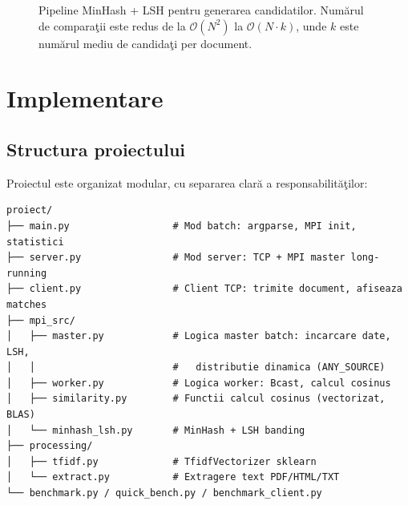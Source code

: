 \documentclass[a4paper,12pt]{report}
\begin{document}
\begin{figure}[H]
\centering
{}
\caption{Pipeline MinHash + LSH pentru generarea candidatilor. Num\u{a}rul de compara\c{t}ii este redus de la $\mathcal{O}(N^2)$ la $\mathcal{O}(N \cdot k)$, unde $k$ este num\u{a}rul mediu de candida\c{t}i per document.}
\label{fig:lsh_pipeline}
\end{figure}

\chapter{Implementare}

\section{Structura proiectului}

Proiectul este organizat modular, cu separarea clar\u{a} a responsabilit\u{a}\c{t}ilor:

\begin{verbatim}
proiect/
├── main.py                  # Mod batch: argparse, MPI init, statistici
├── server.py                # Mod server: TCP + MPI master long-running
├── client.py                # Client TCP: trimite document, afiseaza matches
├── mpi_src/
│   ├── master.py            # Logica master batch: incarcare date, LSH,
│   │                        #   distributie dinamica (ANY_SOURCE)
│   ├── worker.py            # Logica worker: Bcast, calcul cosinus
│   ├── similarity.py        # Functii calcul cosinus (vectorizat, BLAS)
│   └── minhash_lsh.py       # MinHash + LSH banding
├── processing/
│   ├── tfidf.py             # TfidfVectorizer sklearn
│   └── extract.py           # Extragere text PDF/HTML/TXT
└── benchmark.py / quick_bench.py / benchmark_client.py
\end{verbatim}
\end{document}
